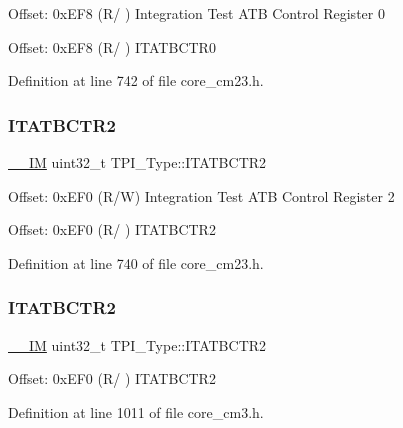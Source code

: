 Offset\+: 0x\+E\+F8 (R/ ) Integration Test A\+TB Control Register 0

Offset\+: 0x\+E\+F8 (R/ ) I\+T\+A\+T\+B\+C\+T\+R0 

Definition at line 742 of file core\+\_\+cm23.\+h.

\mbox{\label{struct_t_p_i___type_ab358319b969d3fed0f89bbe33e9f1652}} 
\subsubsection{\texorpdfstring{I\+T\+A\+T\+B\+C\+T\+R2}{ITATBCTR2}\hspace{0.1cm}{\footnotesize\ttfamily [1/2]}}
{\footnotesize\ttfamily \hyperlink{core__sc300_8h_a4cc1649793116d7c2d8afce7a4ffce43}{\+\_\+\+\_\+\+IM} uint32\+\_\+t T\+P\+I\+\_\+\+Type\+::\+I\+T\+A\+T\+B\+C\+T\+R2}

Offset\+: 0x\+E\+F0 (R/W) Integration Test A\+TB Control Register 2

Offset\+: 0x\+E\+F0 (R/ ) I\+T\+A\+T\+B\+C\+T\+R2 

Definition at line 740 of file core\+\_\+cm23.\+h.

\mbox{\label{struct_t_p_i___type_ab358319b969d3fed0f89bbe33e9f1652}} 
\subsubsection{\texorpdfstring{I\+T\+A\+T\+B\+C\+T\+R2}{ITATBCTR2}\hspace{0.1cm}{\footnotesize\ttfamily [2/2]}}
{\footnotesize\ttfamily \hyperlink{core__sc300_8h_a4cc1649793116d7c2d8afce7a4ffce43}{\+\_\+\+\_\+\+IM} uint32\+\_\+t T\+P\+I\+\_\+\+Type\+::\+I\+T\+A\+T\+B\+C\+T\+R2}

Offset\+: 0x\+E\+F0 (R/ ) I\+T\+A\+T\+B\+C\+T\+R2 

Definition at line 1011 of file core\+\_\+cm3.\+h.

\mbox{\label{struct_t_p_i___type_aaa4c823c10f115f7517c82ef86a5a68d}} 
